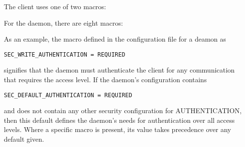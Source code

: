 The client uses one of two macros:
\begin{description}
\item{}
\item{}
\end{description}

For the daemon, there are eight macros:
\begin{description}
\item{}
\item{}
\item{}
\item{}
\item{}
\item{}
\item{}
\item{}
\end{description}

As an example, the macro defined in the configuration file
for a deamon as
\begin{verbatim}
SEC_WRITE_AUTHENTICATION = REQUIRED
\end{verbatim}
signifies that the daemon must authenticate the client for
any communication that requires the  access level.
If the daemon's configuration contains
\begin{verbatim}
SEC_DEFAULT_AUTHENTICATION = REQUIRED
\end{verbatim}
and does not contain any other security configuration for
AUTHENTICATION, then this default defines the daemon's needs
for authentication over all access levels.
Where a specific macro is present, its value takes
precedence over any default given.


